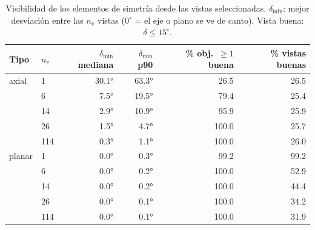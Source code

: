 \begin{table}[htbp]
\centering
\small
\caption{Visibilidad de los elementos de simetría desde las vistas seleccionadas. $\delta_{\min}$: mejor desviación entre las $n_v$ vistas ($0^\circ$ = el eje o plano se ve de canto). Vista buena: $\delta \leq 15^\circ$.}
\label{tab:visibilidad}
\begin{tabular}{llrrrr}
\toprule
Tipo & $n_v$ & $\delta_{\min}$ mediana & $\delta_{\min}$ p90 & \% obj.\ $\geq 1$ buena & \% vistas buenas \\
\midrule
axial & 1 & 30.1° & 63.3° & 26.5 & 26.5 \\
 & 6 & 7.5° & 19.5° & 79.4 & 25.4 \\
 & 14 & 2.9° & 10.9° & 95.9 & 25.9 \\
 & 26 & 1.5° & 4.7° & 100.0 & 25.7 \\
 & 114 & 0.3° & 1.1° & 100.0 & 26.0 \\
\midrule
planar & 1 & 0.0° & 0.3° & 99.2 & 99.2 \\
 & 6 & 0.0° & 0.2° & 100.0 & 52.9 \\
 & 14 & 0.0° & 0.2° & 100.0 & 44.4 \\
 & 26 & 0.0° & 0.1° & 100.0 & 34.2 \\
 & 114 & 0.0° & 0.1° & 100.0 & 31.9 \\
\bottomrule
\end{tabular}
\end{table}
